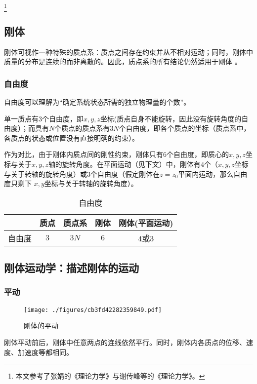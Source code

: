 
\footnote{本文参考了张娟的《理论力学》与谢传峰等的《理论力学》。}

\subsection{刚体}
刚体可视作一种特殊的质点系：质点之间存在约束并从不相对运动；同时，刚体中质量的分布是连续的而非离散的。因此，质点系的所有结论仍然适用于刚体 。

\subsubsection{自由度}
自由度可以理解为“确定系统状态所需的独立物理量的个数”。

单一质点有$3$个自由度，即$x,y,z$坐标(质点自身不能旋转，因此没有旋转角度的自由度）；而具有$N$个质点的质点系有$3N$个自由度，即各个质点的坐标（质点系中，各质点的状态或位置没有直接明确的约束）。

作为对比，由于刚体内质点间的刚性约束，刚体只有$6$个自由度，即质心的$x,y,z$坐标与关于$x,y,z$轴的旋转角度。在平面运动（见下文）中，刚体有$4$个（$x,y,z$坐标与关于转轴的旋转角度）或$3$个自由度（假定刚体在$z=z_0$平面内运动，那么自由度只剩下 $x,y$坐标与关于转轴的旋转角度）。

\begin{table}[ht]
\centering
\caption{自由度}\label{tab_RGAB_3}
\begin{tabular}{|c|c|c|c|c|}
\hline
 & 质点 & 质点系 & 刚体 & 刚体(平面运动)\\
\hline
自由度 & $3$ & $3N$ & $6$ & $4$或$3$ \\
\hline
\end{tabular}
\end{table}

\subsection{刚体运动学：描述刚体的运动}

\subsubsection{平动}
\begin{figure}[ht]
\centering
\texttt{[image: ./figures/cb3fd42282359849.pdf]}
\caption{刚体的平动} \label{fig_RGAB_1}
\end{figure}
刚体平动前后，刚体中任意两点的连线依然平行。同时，刚体内各质点的位移、速度、加速度等都相同。

